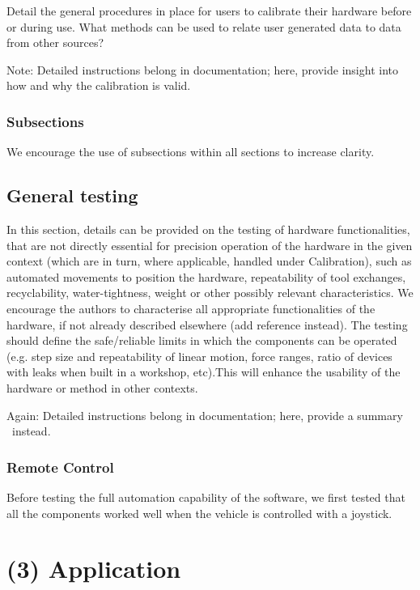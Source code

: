 \documentclass[a4paper]{article}
\begin{document}
Detail the general procedures in place for users to calibrate their
hardware before or during use. What methods can be used to relate user
generated data to data from other sources? 

Note: Detailed instructions belong in documentation; here, provide
insight into how and why the calibration is valid.


\subsubsection{Subsections}\label{h.6mrkl1u5j8xc}

We encourage the use of subsections within all sections to increase
clarity.


\subsection{General testing}\label{h.wbekh9ay82yu}

In this section, details can be provided on the testing of hardware
functionalities, that are not directly essential for precision
operation of the hardware in the given context (which are in turn,
where applicable, handled under Calibration), such as automated
movements to position the hardware, repeatability of tool exchanges,
recyclability, water-tightness, weight or other possibly relevant
characteristics. We encourage the authors to characterise all
appropriate functionalities of the hardware, if not already described
elsewhere (add reference instead). The testing should define the
safe/reliable limits in which the components can be operated (e.g. step
size and repeatability of linear motion, force ranges, ratio of devices
with leaks when built in a workshop, etc).This will enhance the
usability of the hardware or method in other contexts.

Again: Detailed instructions belong in documentation; here, provide a
summary ~instead.

\subsubsection{Remote Control}

Before testing the full automation capability of the software, we first tested that all the components worked well when the vehicle is controlled with a joystick.




\section{(3) Application}\label{h.f78bi3oom0mu}
\end{document}
